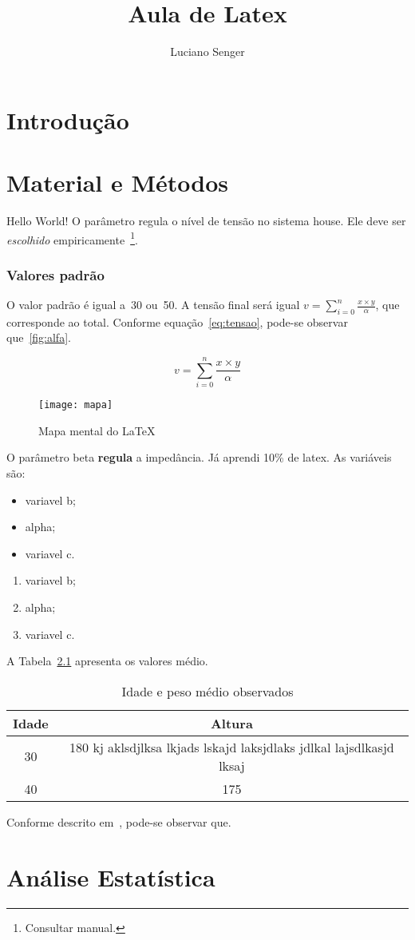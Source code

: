 \documentclass[a4paper, brazil, 12pt , onecolumn]{report}
\title{Aula de Latex}
\author{Luciano Senger}
\begin{document}
	\maketitle
	\tableofcontents
	\listoffigures
	\listoftables
\chapter{Introdução}
\lipsum[1-3]
\chapter{Material e Métodos}

Hello    World!
O parâmetro   regula o nível  de tensão no sistema house.
Ele deve ser \textit{escolhido} empiricamente~\footnote{Consultar manual.}.
\subsection{Valores padrão}
O valor padrão é igual a~30 ou~50.
A tensão final será igual $v = \sum_{i=0}^n \frac{x \times y}{\alpha}$, que corresponde ao total.
Conforme equação~\ref{eq:tensao}, pode-se observar que~\ref{fig:alfa}.

\begin{equation}
	v = \sum_{i=0}^n \frac{x \times y}{\alpha}
\end{equation}\label{eq:tensao}

\begin{figure}[htb]
	\centering
	\texttt{[image: mapa]}
	\caption{Mapa mental do \LaTeX}
\end{figure}\label{fig:alfa}

O parâmetro {\Huge beta} \textbf{regula} a impedância.
Já aprendi 10\% de latex.
As variáveis são:
\begin{itemize}
	\item variavel b;
	\item alpha;
	\item variavel c.
\end{itemize}

\begin{enumerate}
	\item variavel b;
	\item alpha;
	\item variavel c.
\end{enumerate}
A Tabela~\ref{tab:idade} apresenta os valores médio.
\begin{table}[htb]
	\caption{Idade e peso médio observados}\label{tab:idade}
	\centering
	
	\begin{tabular}{cc}
		\hline
		\bf Idade & \bf Altura \\ 
		\hline
		30 & 180 kj aklsdjlksa lkjads lskajd laksjdlaks jdlkal lajsdlkasjd lksaj\\
		40 & 175 \\
		\hline
\end{tabular}		
\end{table}
\lstset{language=Python}


Conforme descrito em~\cite{Harris2012,Hennessy2014,Goodfellow2016,Mota2011}, pode-se observar que.
\appendix
\chapter{Análise Estatística}
\lipsum[3-8]
\printindex


\end{document}
